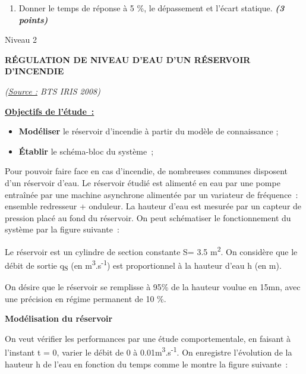 \begin{enumerate}
\def\labelenumi{\arabic{enumi}.}
\setcounter{enumi}{2}
\item
  Donner le temps de réponse à 5 \%, le dépassement et l'écart statique.
  \emph{\textbf{(3 points)}}
\end{enumerate}


Niveau 2

\textbf{RÉGULATION DE NIVEAU D'EAU D'UN RÉSERVOIR D'INCENDIE}

\emph{(\ul{Source :} BTS IRIS 2008)}

\textbf{\ul{Objectifs de l'étude~:}}

\begin{itemize}
\item
  \textbf{Modéliser} le réservoir d'incendie à partir du modèle de
  connaissance ;
\item
  \textbf{Établir} le schéma-bloc du système~;
\end{itemize}

Pour pouvoir faire face en cas d'incendie, de nombreuses communes
disposent d'un réservoir d'eau. Le réservoir étudié est alimenté en eau
par une pompe entraînée par une machine asynchrone alimentée par un
variateur de fréquence~: ensemble redresseur + onduleur. La hauteur
d'eau est mesurée par un capteur de pression placé au fond du réservoir.
On peut schématiser le fonctionnement du système par la figure
suivante~:


Le réservoir est un cylindre de section constante S= 3.5
m\textsuperscript{2}. On considère que le débit de sortie
q\textsubscript{S} (en m\textsuperscript{3}.s\textsuperscript{-1}) est
proportionnel à la hauteur d'eau h (en m).

On désire que le réservoir se remplisse à 95\% de la hauteur voulue en
15mn, avec une précision en régime permanent de 10 \%.

\textbf{Modélisation du réservoir}

On veut vérifier les performances par une étude comportementale, en
faisant à l'instant t = 0, varier le débit de 0 à
0.01m\textsuperscript{3}.s\textsuperscript{-1}. On enregistre
l'évolution de la hauteur h de l'eau en fonction du temps comme le
montre la figure suivante~:


